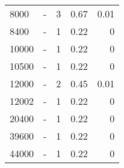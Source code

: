 \begin{longtable}{lXrrr}
        8000 & \multicolumn{1}{X}{-} & %
          \num{3} &
          \num[round-mode=places,round-precision=2]{0.67} &
          \num[round-mode=places,round-precision=2]{0.01} \\

        8400 & \multicolumn{1}{X}{-} & %
          \num{1} &
          \num[round-mode=places,round-precision=2]{0.22} &
          \num[round-mode=places,round-precision=2]{0} \\

        10000 & \multicolumn{1}{X}{-} & %
          \num{1} &
          \num[round-mode=places,round-precision=2]{0.22} &
          \num[round-mode=places,round-precision=2]{0} \\

        10500 & \multicolumn{1}{X}{-} & %
          \num{1} &
          \num[round-mode=places,round-precision=2]{0.22} &
          \num[round-mode=places,round-precision=2]{0} \\

        12000 & \multicolumn{1}{X}{-} & %
          \num{2} &
          \num[round-mode=places,round-precision=2]{0.45} &
          \num[round-mode=places,round-precision=2]{0.01} \\

        12002 & \multicolumn{1}{X}{-} & %
          \num{1} &
          \num[round-mode=places,round-precision=2]{0.22} &
          \num[round-mode=places,round-precision=2]{0} \\

        20400 & \multicolumn{1}{X}{-} & %
          \num{1} &
          \num[round-mode=places,round-precision=2]{0.22} &
          \num[round-mode=places,round-precision=2]{0} \\

        39600 & \multicolumn{1}{X}{-} & %
          \num{1} &
          \num[round-mode=places,round-precision=2]{0.22} &
          \num[round-mode=places,round-precision=2]{0} \\

        44000 & \multicolumn{1}{X}{-} & %
          \num{1} &
          \num[round-mode=places,round-precision=2]{0.22} &
          \num[round-mode=places,round-precision=2]{0} \\


\end{longtable}
